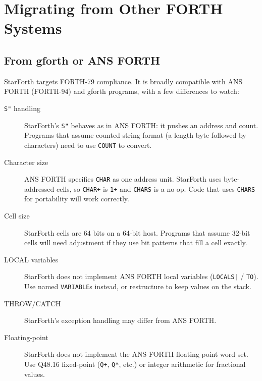 
\chapter{Migrating from Other FORTH Systems}
\label{chap:migrating}

\section{From gforth or ANS FORTH}
\label{sec:migrate-gforth}

StarForth targets FORTH-79 compliance. It is broadly compatible with ANS FORTH
(FORTH-94) and gforth programs, with a few differences to watch:

\begin{description}
  \item[\texttt{S"} handling] StarForth's \texttt{S"} behaves as in ANS FORTH:
    it pushes an address and count. Programs that assume counted-string format
    (a length byte followed by characters) need to use \texttt{COUNT} to
    convert.

  \item[Character size] ANS FORTH specifies \texttt{CHAR} as one address unit.
    StarForth uses byte-addressed cells, so \texttt{CHAR+} is \texttt{1+} and
    \texttt{CHARS} is a no-op. Code that uses \texttt{CHARS} for portability
    will work correctly.

  \item[Cell size] StarForth cells are 64 bits on a 64-bit host. Programs
    that assume 32-bit cells will need adjustment if they use bit patterns that
    fill a cell exactly.

  \item[LOCAL variables] StarForth does not implement ANS FORTH local variables
    (\texttt{LOCALS|} / \texttt{TO}). Use named \texttt{VARIABLE}s instead, or
    restructure to keep values on the stack.

  \item[THROW/CATCH] StarForth's exception handling may differ from ANS FORTH.

  \item[Floating-point] StarForth does not implement the ANS FORTH floating-point
    word set. Use Q48.16 fixed-point (\texttt{Q+}, \texttt{Q*}, etc.) or integer
    arithmetic for fractional values.
\end{description}

